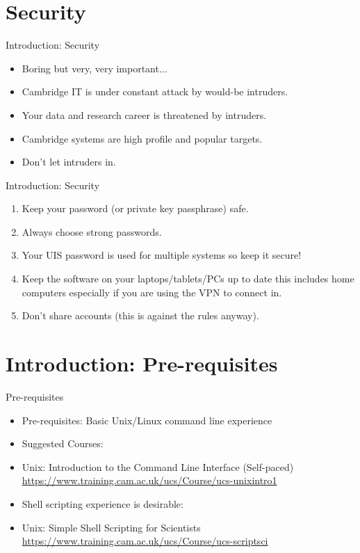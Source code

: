 \section{Security}
\begin{frame}{Introduction: Security}
\begin{itemize}
\item{\alert{Boring but very, very important${}\ldots$}}
\pause
\item{Cambridge IT is under constant attack by would-be intruders.}
\pause
\item{Your data and research career is threatened by intruders.}
\pause
\item{\alert{Cambridge systems} are high profile and popular targets.}
\pause
\item{\alert{Don't let intruders in.}}
\end{itemize}
\end{frame}

\begin{frame}{Introduction: Security}
\begin{enumerate}
\item{\alert{Keep your password (or private key passphrase) safe.}}
\pause
\item{\alert{Always choose strong passwords.}}
\pause
\item{\alert{Your UIS password is used for multiple systems so keep it secure!}}
\pause
\item{Keep the software on your laptops/tablets/PCs up to date this includes home computers especially if you are using the VPN to connect in.}
\pause
\item{Don't share accounts (this is against the rules anyway).}
\end{enumerate}
\end{frame}

\section{Introduction: Pre-requisites}
\begin{frame}{Pre-requisites}
\begin{itemize}
\item{Pre-requisites: Basic Unix/Linux command line experience}
\pause
\item{Suggested Courses:}
\item Unix: Introduction to the Command Line Interface (Self-paced)
\small {\url{https://www.training.cam.ac.uk/ucs/Course/ucs-unixintro1}} 
\pause
\item Shell scripting experience is desirable:
\item Unix: Simple Shell Scripting for Scientists
\small {\url{https://www.training.cam.ac.uk/ucs/Course/ucs-scriptsci}} 
\end{itemize}
\end{frame}

